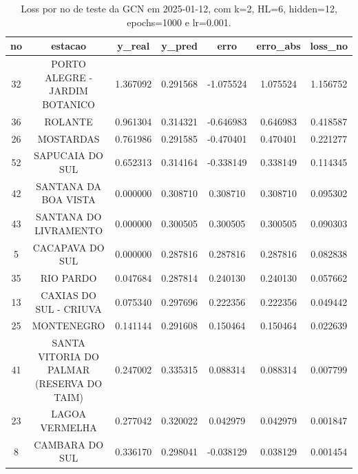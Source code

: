 \begin{table}[h]
\centering
\caption{Loss por no de teste da GCN em 2025-01-12, com k=2, HL=6, hidden=12, epochs=1000 e lr=0.001.}
\label{tab:gcn_loss_k2_hl6_h12_e1000_d20250112}
\begin{tabular}{ccccccc}
\toprule
no & estacao & y\_real & y\_pred & erro & erro\_abs & loss\_no \\
\midrule
32 & PORTO ALEGRE - JARDIM BOTANICO & 1.367092 & 0.291568 & -1.075524 & 1.075524 & 1.156752 \\
36 & ROLANTE & 0.961304 & 0.314321 & -0.646983 & 0.646983 & 0.418587 \\
26 & MOSTARDAS & 0.761986 & 0.291585 & -0.470401 & 0.470401 & 0.221277 \\
52 & SAPUCAIA DO SUL & 0.652313 & 0.314164 & -0.338149 & 0.338149 & 0.114345 \\
42 & SANTANA DA BOA VISTA & 0.000000 & 0.308710 & 0.308710 & 0.308710 & 0.095302 \\
43 & SANTANA DO LIVRAMENTO & 0.000000 & 0.300505 & 0.300505 & 0.300505 & 0.090303 \\
5 & CACAPAVA DO SUL & 0.000000 & 0.287816 & 0.287816 & 0.287816 & 0.082838 \\
35 & RIO PARDO & 0.047684 & 0.287814 & 0.240130 & 0.240130 & 0.057662 \\
13 & CAXIAS DO SUL - CRIUVA & 0.075340 & 0.297696 & 0.222356 & 0.222356 & 0.049442 \\
25 & MONTENEGRO & 0.141144 & 0.291608 & 0.150464 & 0.150464 & 0.022639 \\
41 & SANTA VITORIA DO PALMAR (RESERVA DO TAIM) & 0.247002 & 0.335315 & 0.088314 & 0.088314 & 0.007799 \\
23 & LAGOA VERMELHA & 0.277042 & 0.320022 & 0.042979 & 0.042979 & 0.001847 \\
8 & CAMBARA DO SUL & 0.336170 & 0.298041 & -0.038129 & 0.038129 & 0.001454 \\
\bottomrule
\end{tabular}
\end{table}

